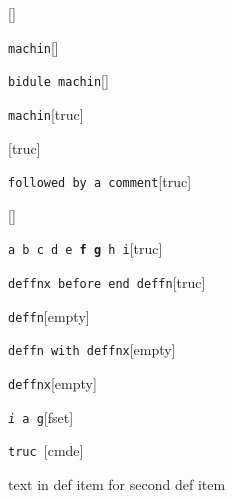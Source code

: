 \documentclass{book}
\begin{document}
%
\noindent\texttt\bgroup{}\egroup{}\hfill[]



\noindent\texttt\bgroup{}machin\egroup{}\hfill[]



%
\noindent\texttt\bgroup{}bidule machin\egroup{}\hfill[]



%
\noindent\texttt\bgroup{}machin\egroup{}\hfill[truc]



%
\noindent\texttt\bgroup{}\egroup{}\hfill[truc]



\noindent\texttt\bgroup{}followed by a comment\egroup{}\hfill[truc]



%
\noindent\texttt\bgroup{}\egroup{}\hfill[]



\noindent\texttt\bgroup{}a b c d e \textbf{f g} h i\egroup{}\hfill[truc]



%
\noindent\texttt\bgroup{}deffnx before end deffn\egroup{}\hfill[truc]



%


\noindent\texttt\bgroup{}deffn\egroup{}\hfill[empty]



%

\noindent\texttt\bgroup{}deffn with deffnx\egroup{}\hfill[empty]



%
\noindent\texttt\bgroup{}deffnx\egroup{}\hfill[empty]



%

\noindent\texttt\bgroup{}\emph{i} a g\egroup{}\hfill[fset]



%
\noindent\texttt\bgroup{}truc \egroup{}\hfill[cmde]



%
text in def item for second def item
\end{document}
